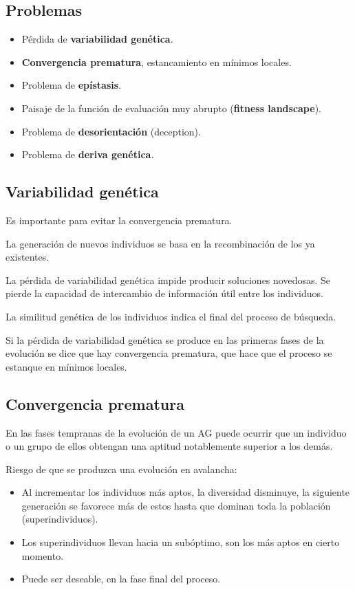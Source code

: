 \documentclass[12pt, twoside, openright]{report} %
\begin{document}
\subsection{Problemas}
\begin{itemize}
	\item  Pérdida de \textbf{variabilidad genética}.
	\item  \textbf{Convergencia prematura}, estancamiento en mínimos locales.
	\item  Problema de \textbf{epístasis}.
	\item  Paisaje de la función de evaluación muy abrupto (\textbf{fitness landscape}).
	\item  Problema de \textbf{desorientación} (deception).
	\item  Problema de \textbf{deriva genética}.
\end{itemize}

\subsection{Variabilidad genética}
Es importante para evitar la convergencia prematura.

La generación de nuevos individuos se basa en la recombinación de los ya existentes.

La pérdida de variabilidad genética impide producir soluciones novedosas. Se pierde la capacidad de intercambio de información útil entre los individuos.

La similitud genética de los individuos indica el final del proceso de búsqueda.

Si la pérdida de variabilidad genética se produce en las primeras fases de la evolución se dice que hay convergencia prematura, que hace que el proceso se estanque en mínimos locales.

\subsection{Convergencia prematura}
En las fases tempranas de la evolución de un AG puede ocurrir que un individuo o un grupo de ellos obtengan una aptitud notablemente superior a los demás.

Riesgo de que se produzca una evolución en avalancha:
\begin{itemize}
	\item Al incrementar los individuos más aptos, la diversidad disminuye, la siguiente generación se favorece más de estos hasta que dominan toda la población (superindividuos).
	\item Los superindividuos llevan hacia un subóptimo, son los más aptos en cierto momento.
	\item Puede ser deseable, en la fase final del proceso.
\end{itemize}
\end{document}
